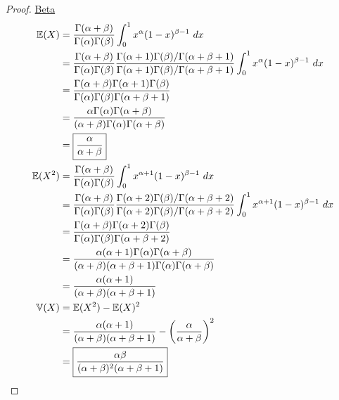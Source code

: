 \documentclass[a4paper]{article}
\begin{document}
\begin{proof}[Proof]
\underline{Beta}
\begin{align*}
	\mathbb{E}(X) & = \frac{\Gamma (\alpha + \beta )}{\Gamma(\alpha ) \Gamma(\beta )} \int^{1}_{0} x^{\alpha } (1-x)^{\beta -1} \ dx  \\
	 & = \frac{\Gamma(\alpha + \beta)}{\Gamma(\alpha ) \Gamma(\beta )} \frac{\Gamma(\alpha + 1) \Gamma(\beta ) / \Gamma( \alpha + \beta + 1)}{\Gamma(\alpha + 1) \Gamma(\beta) / \Gamma(\alpha + \beta + 1)} \int^{1}_{0} x^{\alpha } (1-x)^{\beta - 1} \ dx  \\ 
	 & = \frac{\Gamma(\alpha + \beta) \Gamma(\alpha + 1) \Gamma(\beta)}{\Gamma(\alpha) \Gamma(\beta) \Gamma(\alpha + \beta + 1)} \\
	 & = \frac{\alpha \Gamma(\alpha) \Gamma(\alpha + \beta)}{(\alpha + \beta) \Gamma(\alpha) \Gamma(\alpha + \beta)} \\
	 & = \boxed{\frac{\alpha }{\alpha + \beta }} \\
	\mathbb{E}(X^{2}) & = \frac{\Gamma(\alpha + \beta)}{\Gamma(\alpha) \Gamma(\beta)} \int^{1}_{0} x^{\alpha + 1} (1-x)^{\beta - 1} \ dx \\
	 & = \frac{\Gamma(\alpha + \beta )}{\Gamma(\alpha) \Gamma(\beta)} \frac{\Gamma(\alpha +2) \Gamma(\beta) / \Gamma(\alpha + \beta + 2)}{\Gamma(\alpha + 2) \Gamma(\beta) / \Gamma(\alpha + \beta + 2)} \int^{1}_{0} x^{\alpha + 1} (1-x)^{\beta - 1} \ dx \\
	 & = \frac{\Gamma(\alpha + \beta) \Gamma(\alpha + 2) \Gamma(\beta)}{\Gamma(\alpha) \Gamma(\beta) \Gamma(\alpha + \beta + 2)} \\
	 &= \frac{\alpha (\alpha + 1) \Gamma(\alpha) \Gamma(\alpha + \beta)}{(\alpha + \beta) (\alpha + \beta + 1) \Gamma(\alpha) \Gamma(\alpha + \beta)} \\
	 & = \frac{\alpha (\alpha + 1)}{(\alpha + \beta )(\alpha + \beta + 1)} \\
	\mathbb{V}(X) & = \mathbb{E}(X^{2}) - \mathbb{E}(X)^{2} \\
	 & = \frac{\alpha (\alpha + 1)}{(\alpha + \beta)(\alpha + \beta + 1)} - \left( \frac{\alpha }{\alpha + \beta } \right)^{2} \\
	 & = \boxed{\frac{\alpha \beta }{(\alpha + \beta)^{2} (\alpha + \beta + 1)}}
\end{align*}
\end{proof}

\newpage
\end{document}
